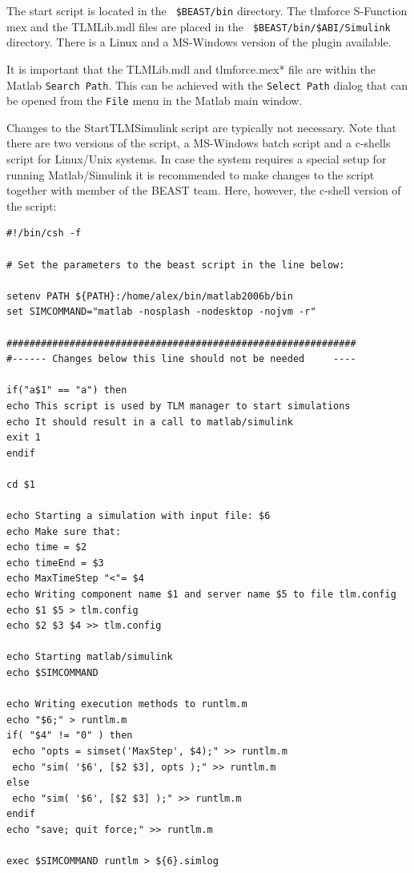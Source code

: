 The start script is located in the {\tt
\$BEAST/bin} directory. The tlmforce S-Function mex and
the TLMLib.mdl files are placed in the {\tt
\$BEAST/bin/\$ABI/Simulink} directory. There is a Linux and a MS-Windows
version of the plugin available.

It is important that the TLMLib.mdl and tlmforce.mex* file are within
the Matlab {\tt Search Path}. This can be achieved with the {\tt Select
Path} dialog that can be opened from the {\tt File} menu in the Matlab
main window.

Changes to the StartTLMSimulink script are typically not
necessary. Note that there are two versions of the script, a
MS-Windows batch script and a c-shells script for Linux/Unix
systems. In case the system requires a special setup for running
Matlab/Simulink it is recommended to make changes to the script
together with member of the BEAST team. Here, however, the c-shell
version of the script:
\begin{verbatim}
#!/bin/csh -f

# Set the parameters to the beast script in the line below:

setenv PATH ${PATH}:/home/alex/bin/matlab2006b/bin
set SIMCOMMAND="matlab -nosplash -nodesktop -nojvm -r"

#############################################################
#------ Changes below this line should not be needed     ----

if("a$1" == "a") then
echo This script is used by TLM manager to start simulations
echo It should result in a call to matlab/simulink
exit 1
endif

cd $1

echo Starting a simulation with input file: $6
echo Make sure that:
echo time = $2
echo timeEnd = $3
echo MaxTimeStep "<"= $4
echo Writing component name $1 and server name $5 to file tlm.config
echo $1 $5 > tlm.config
echo $2 $3 $4 >> tlm.config

echo Starting matlab/simulink
echo $SIMCOMMAND

echo Writing execution methods to runtlm.m
echo "$6;" > runtlm.m
if( "$4" != "0" ) then
 echo "opts = simset('MaxStep', $4);" >> runtlm.m
 echo "sim( '$6', [$2 $3], opts );" >> runtlm.m
else
 echo "sim( '$6', [$2 $3] );" >> runtlm.m
endif
echo "save; quit force;" >> runtlm.m

exec $SIMCOMMAND runtlm > ${6}.simlog
\end{verbatim}


